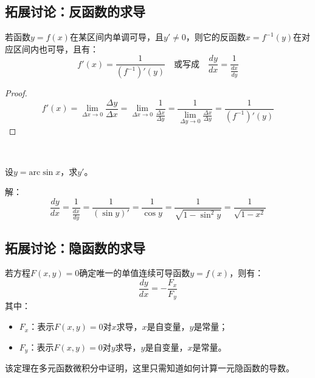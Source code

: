 \subsection{拓展讨论：反函数的求导}

\begin{theorem}[反函数求导定理]
若函数$y=f\left( x \right) $在某区间内单调可导，且$y'\ne 0$，则它的反函数$x=f^{-1}\left( y \right) $在对应区间内也可导，且有：
\[
f'\left( x \right) =\frac{1}{\left( f^{-1} \right) '\left( y \right)} \quad \text{或写成} \quad \frac{dy}{dx}=\frac{1}{\frac{dx}{dy}}
\]
\end{theorem}

\begin{proof}
\[
f'\left( x \right) =\underset{\Delta x\rightarrow 0}{\lim}\frac{\Delta y}{\Delta x}=\underset{\Delta x\rightarrow 0}{\lim}\frac{1}{\frac{\Delta x}{\Delta y}}=\frac{1}{\underset{\Delta y\rightarrow 0}{\lim}\frac{\Delta x}{\Delta y}}=\frac{1}{\left( f^{-1} \right) '\left( y \right)}
\]
\end{proof}

~

\begin{example}
设$y=\mathrm{arc}\sin x$，求$y'$。
\end{example}

解：
\[
\frac{dy}{dx}=\frac{1}{\frac{dx}{dy}}=\frac{1}{\left( \sin y \right) '}=\frac{1}{\cos y}=\frac{1}{\sqrt{1-\sin ^2y}}=\frac{1}{\sqrt{1-x^2}}
\]

\subsection{拓展讨论：隐函数的求导}

\begin{theorem}[一元隐函数求导定理]
若方程$F\left( x,y \right) =0$确定唯一的单值连续可导函数$y=f\left( x \right) $，则有：
\[
\frac{dy}{dx}=-\frac{F_x}{F_y}
\]
其中：
\begin{itemize}
    \item $F_x$：表示$F\left( x,y \right) =0$对$x$求导，$x$是自变量，$y$是常量；
    \item $F_y$：表示$F\left( x,y \right) =0$对$y$求导，$y$是自变量，$x$是常量。
\end{itemize}
\end{theorem}

\begin{tcolorbox}
该定理在多元函数微积分中证明，这里只需知道如何计算一元隐函数的导数。
\end{tcolorbox}

